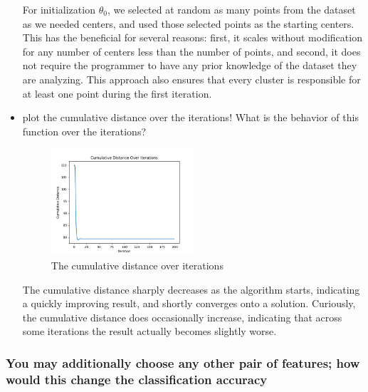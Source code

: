 \documentclass[a4paper]{article}
\begin{document}
\begin{itemize}
	For initialization $\theta_0$, we selected at random as many points from the dataset as we needed centers, and used those selected points as the starting centers.  This has the beneficial for several reasons: first, it scales without modification for any number of centers less than the number of points, and second, it does not require the programmer to have any prior knowledge of the dataset they are analyzing.  This approach also ensures that every cluster is responsible for at least one point during the first iteration.	

	\clearpage
	\item plot the cumulative distance over the iterations! What is the behavior of this function over the iterations?

	\begin{figure}[h]
		\begin{center}
			\includegraphics[width=0.5\textwidth]{kmeans_convergence.png}
			\caption{The cumulative distance over iterations}
		\end{center}
	\end{figure}
	The cumulative distance sharply decreases as the algorithm starts, indicating a quickly improving result, and shortly converges onto a solution.  Curiously, the cumulative distance does occasionally increase, indicating that across some iterations the result actually becomes slightly worse.\\

	\end{itemize}	
	
	\clearpage
	
	\subsubsection{You may additionally choose any other pair of features; how would this change the classiﬁcation accuracy}
	
\end{document}
